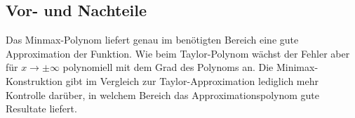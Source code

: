 \subsection{Vor- und Nachteile}
Das Minmax-Polynom liefert genau im benötigten Bereich eine gute
Approximation der Funktion.
Wie beim Taylor-Polynom wächst der Fehler aber für $x\to\pm\infty$
polynomiell mit dem Grad des Polynoms an.
Die Minimax-Konstruktion gibt im Vergleich zur Taylor-Approximation
lediglich mehr Kontrolle darüber, in welchem Bereich das
Approximationspolynom gute Resultate liefert.

